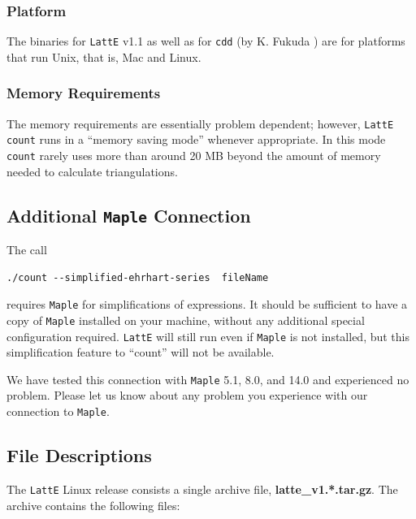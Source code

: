 \documentclass{article}
\newcommand{\latte}{{\tt LattE}\xspace}
\newcommand{\maple}{{\tt Maple}\xspace}
\begin{document}
\subsubsection{Platform} 
The binaries for \latte v1.1 as well as for {\tt cdd} (by
K. Fukuda \cite{fukuda}) are for platforms that run Unix, that is, Mac and Linux.

\subsubsection{Memory Requirements} 
The memory requirements are essentially problem dependent; however,
{\tt LattE count} runs in a ``memory saving mode'' whenever appropriate.
In this mode {\tt count} rarely uses more than around 20 MB beyond the
amount of memory needed to calculate triangulations. 

\subsection{Additional \maple Connection}
The call
\begin{verbatim}
./count --simplified-ehrhart-series  fileName
\end{verbatim}
requires \maple for simplifications of expressions. It should be
sufficient to have a copy of \maple installed on your machine,
without any additional special configuration required.  \latte
will still run even if \maple is not installed, but this
simplification feature to ``count'' will not be available. 

We have tested this connection with \maple 5.1, 8.0, and 14.0 and experienced
no problem. Please let us know about any problem you experience with
our connection to \maple.

\subsection{File Descriptions} 
\label{section:file-descriptions}
The {\tt LattE} Linux release consists a single archive file,
\textbf{latte\_v1.*.tar.gz}. The archive contains the following files:
\end{document}
